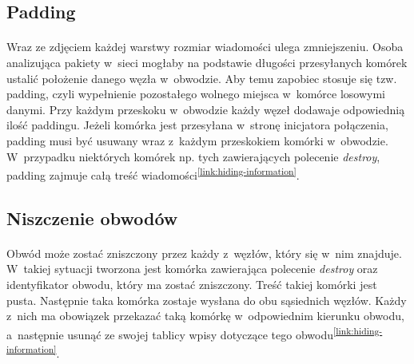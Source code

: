 \subsection{Padding}\paragraph{}
Wraz ze zdjęciem każdej warstwy rozmiar wiadomości ulega zmniejszeniu. Osoba analizująca pakiety w~sieci mogłaby na podstawie długości przesyłanych komórek ustalić położenie danego węzła w~obwodzie. Aby temu zapobiec stosuje się tzw. padding, czyli wypełnienie pozostałego wolnego miejsca w~komórce losowymi danymi. Przy każdym przeskoku w~obwodzie każdy węzeł dodawaje odpowiednią ilość paddingu. Jeżeli komórka jest przesyłana w~stronę inicjatora połączenia, padding musi być usuwany wraz z~każdym przeskokiem komórki w~obwodzie. W~przypadku niektórych komórek np. tych zawierających polecenie \textit{destroy}, padding zajmuje całą treść wiadomości\textsuperscript{\ref{link:hiding-information}}.

\subsection{Niszczenie obwodów}\paragraph{}
Obwód może zostać zniszczony przez każdy z~węzłów, który się w~nim znajduje. W~takiej sytuacji tworzona jest komórka zawierająca polecenie \textit{destroy} oraz identyfikator obwodu, który ma zostać zniszczony. Treść takiej komórki jest pusta. Następnie taka komórka zostaje wysłana do obu sąsiednich węzłów. Każdy z~nich ma obowiązek przekazać taką komórkę w~odpowiednim kierunku obwodu, a~następnie usunąć ze swojej tablicy wpisy dotyczące tego obwodu\textsuperscript{\ref{link:hiding-information}}.

